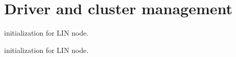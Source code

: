 \hypertarget{group__driver__cluster__group}{}\section{Driver and cluster management}
\label{group__driver__cluster__group}


initialization for L\+I\+N node.  


initialization for L\+I\+N node. 

